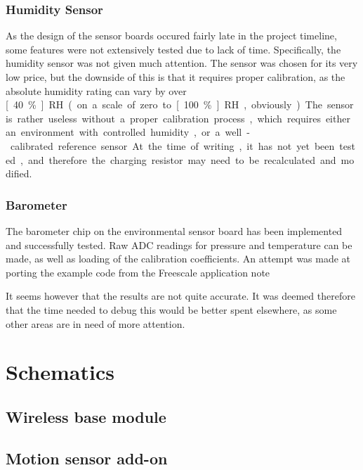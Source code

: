 \subsubsection{Humidity Sensor}
\label{sub2:humidity}
As the design of the sensor boards occured fairly late in the project timeline,
some features were not extensively tested due to lack of time. Specifically, the
humidity sensor was not given much attention. The sensor was chosen for its very
low price, but the downside of this is that it requires proper calibration, as
the absolute humidity rating can vary by over \unit[40\%]{RH} (on a scale of
zero to \unit[100\%]{RH}, obviously). The sensor is rather useless without a
proper calibration process, which requires either an environment with controlled
humidity, or a well-calibrated reference sensor. At the time of writing, it has
not yet been tested, and therefore the charging resistor may need to be
recalculated and modified.

\subsubsection{Barometer}
\label{sub2:barometer}
The barometer chip on the environmental sensor board has been implemented and
successfully tested. Raw ADC readings for pressure and temperature can be made,
as well as loading of the calibration coefficients. An attempt was made
at porting the example code from the Freescale application
note\cite{freescale3785}

It seems however that the results are not quite accurate. It was deemed
therefore that the time needed to debug this would be better spent elsewhere, as
some other areas are in need of more attention.

\pagebreak
\section{Schematics}
\subsection{Wireless base module}
\label{sub:sch-wirelessmodule}


\subsection{Motion sensor add-on}
\label{sub:sch-motionboard}


